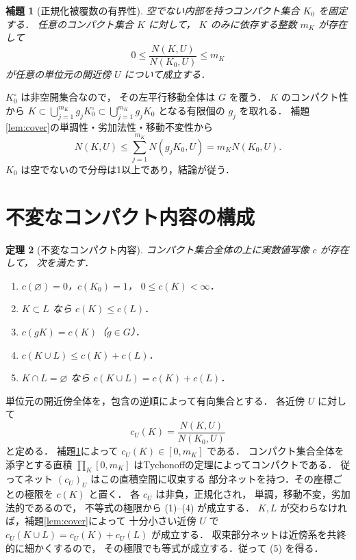 \documentclass[a5paper,10pt,onecolumn]{jsarticle}
\makeatletter
\theoremstyle{mathnotetheorem}
\newtheorem{theorem}{定理}[section]
\newtheorem{lemma}[theorem]{補題}
\renewcommand{\proofname}{証明}
\renewenvironment{proof}[1][\proofname]{%
  \par\pushQED{\qed}\normalfont\topsep4\p@\@plus2\p@\relax
  \trivlist\item[\hskip\labelsep\bfseries #1]\ignorespaces
}{\popQED\endtrivlist\@endpefalse}
\makeatother
\begin{document}
\begin{lemma}[正規化被覆数の有界性]\label{lem:bounded-ratios}
空でない内部を持つコンパクト集合 $K_0$ を固定する．
任意のコンパクト集合 $K$ に対して，
$K$ のみに依存する整数 $m_K$ が存在して
\[
 0\le\frac{N(K,U)}{N(K_0,U)}\le m_K
\]
が任意の単位元の開近傍 $U$ について成立する．
\end{lemma}
\begin{proof}
$K_0^\circ$ は非空開集合なので，
その左平行移動全体は $G$ を覆う．
$K$ のコンパクト性から
$K\subset\bigcup_{j=1}^{m_K}g_jK_0^\circ
\subset\bigcup_{j=1}^{m_K}g_jK_0$
となる有限個の $g_j$ を取れる．
補題\ref{lem:cover}の単調性・劣加法性・移動不変性から
\[
 N(K,U)\le\sum_{j=1}^{m_K}N(g_jK_0,U)
 =m_KN(K_0,U).
\]
$K_0$ は空でないので分母は1以上であり，結論が従う．
\end{proof}

\section{不変なコンパクト内容の構成}

\begin{theorem}[不変なコンパクト内容]\label{thm:content}
コンパクト集合全体の上に実数値写像 $c$ が存在して，
次を満たす．
\begin{enumerate}
\item $c(\varnothing)=0$，$c(K_0)=1$，
  $0\le c(K)<\infty$．
\item $K\subset L$ なら $c(K)\le c(L)$．
\item $c(gK)=c(K)$（$g\in G$）．
\item $c(K\cup L)\le c(K)+c(L)$．
\item $K\cap L=\varnothing$ なら
$c(K\cup L)=c(K)+c(L)$．
\end{enumerate}
\end{theorem}
\begin{proof}
単位元の開近傍全体を，包含の逆順によって有向集合とする．
各近傍 $U$ に対して
\[
 c_U(K)=\frac{N(K,U)}{N(K_0,U)}
\]
と定める．
補題\ref{lem:bounded-ratios}によって
$c_U(K)\in[0,m_K]$ である．
コンパクト集合全体を添字とする直積
$\prod_K[0,m_K]$ はTychonoffの定理によってコンパクトである．
従ってネット $(c_U)_U$ はこの直積空間に収束する
部分ネットを持つ．その座標ごとの極限を $c(K)$ と置く．
各 $c_U$ は非負，正規化され，
単調，移動不変，劣加法的であるので，
不等式の極限から (1)--(4) が成立する．
$K,L$ が交わらなければ，補題\ref{lem:cover}によって
十分小さい近傍 $U$ で
$c_U(K\cup L)=c_U(K)+c_U(L)$ が成立する．
収束部分ネットは近傍系を共終的に細かくするので，
その極限でも等式が成立する．従って (5) を得る．
\end{proof}
\end{document}

